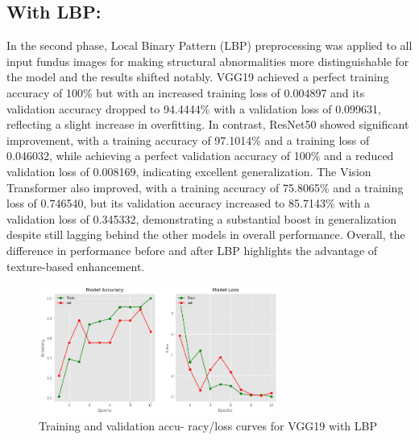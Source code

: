 \documentclass{ijclclp}
\begin{document}

\noindent
\begin{flushleft}
\vspace{1em}
    \subsection{With LBP:}
    \vspace{1em}
    \justifying
    In the second phase, Local Binary Pattern (LBP) preprocessing was applied to all input fundus images for making structural abnormalities more distinguishable for the model and the results shifted notably. VGG19 achieved a perfect training accuracy of 100\% but with an increased training loss of 0.004897 and its validation accuracy dropped to 94.4444\% with a validation loss of 0.099631, reflecting a slight increase in overfitting. In contrast, ResNet50 showed significant improvement, with a training accuracy of 97.1014\% and a training loss of 0.046032, while achieving a perfect validation accuracy of 100\% and a reduced validation loss of 0.008169, indicating excellent generalization. The Vision Transformer also improved, with a training accuracy of 75.8065\% and a training loss of 0.746540, but its validation accuracy increased to 85.7143\% with a validation loss of 0.345332, demonstrating a substantial boost in generalization despite still lagging behind the other models in overall performance. Overall, the difference in performance before and after LBP highlights the advantage of texture-based enhancement.
\begin{figure}[htbp]
    \centering
    \includegraphics[width=0.70\textwidth]{image14.png}
    \caption{Training and validation accu-
racy/loss curves for VGG19 with LBP}
    \label{fig:vgg19_lbp}
\end{figure}


\end{flushleft}
\end{document}
